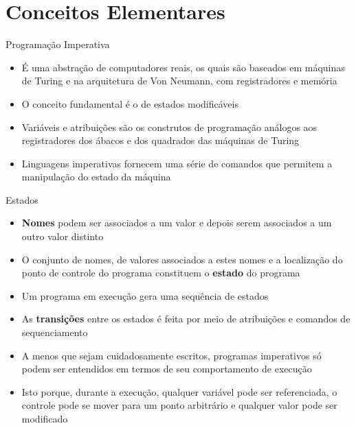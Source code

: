 \section{Conceitos Elementares}

\begin{frame}[fragile]{Programação Imperativa}

    \begin{itemize}
        \item É uma abstração de computadores reais, os quais são baseados em máquinas de Turing e 
            na arquitetura de Von Neumann, com registradores e memória

        \item O conceito fundamental é o de estados modificáveis

        \item Variáveis e atribuições são os construtos de programação análogos aos registradores 
            dos ábacos e dos quadrados das máquinas de Turing

        \item Linguagens imperativas fornecem uma série de comandos que permitem a manipulação do 
            estado da máquina
    \end{itemize}

\end{frame}

\begin{frame}[fragile]{Estados}

    \begin{itemize}
        \item \textbf{Nomes} podem ser associados a um valor e depois serem associados a 
            um outro valor distinto

        \item O conjunto de nomes, de valores associados a estes nomes e a localização do ponto 
            de controle do programa constituem o \textbf{estado} do programa

        \item Um programa em execução gera uma sequência de estados 

        \item As \textbf{transições} entre os estados é feita por meio de atribuições e comandos 
            de sequenciamento

        \item A menos que sejam cuidadosamente escritos, programas imperativos só podem ser 
            entendidos em termos de seu comportamento de execução

        \item Isto porque, durante a execução, qualquer variável pode ser referenciada, o 
            controle pode se mover para um ponto arbitrário e qualquer valor pode ser modificado

    \end{itemize}

\end{frame}

